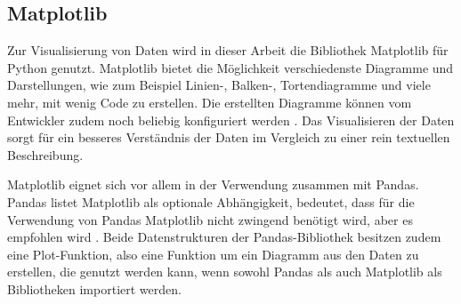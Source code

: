 \subsection{Matplotlib}
Zur Visualisierung von Daten wird in dieser Arbeit die Bibliothek Matplotlib für Python genutzt. Matplotlib bietet die Möglichkeit verschiedenste Diagramme und Darstellungen,
wie zum Beispiel Linien-, Balken-, Tortendiagramme und viele mehr, mit wenig Code zu erstellen. Die erstellten Diagramme können vom Entwickler zudem noch beliebig 
konfiguriert werden \cite[vgl. S.167.]{NumerischesPython}. Das Visualisieren der Daten sorgt für ein besseres Verständnis der Daten im Vergleich zu einer rein textuellen Beschreibung.

Matplotlib eignet sich vor allem in der Verwendung zusammen mit Pandas. Pandas listet Matplotlib als \glqq optionale Abhängigkeit\grqq{}, bedeutet, dass für die Verwendung
von Pandas Matplotlib nicht zwingend benötigt wird, aber es empfohlen wird \cite[vgl. S.253]{NumerischesPython}.
Beide Datenstrukturen der Pandas-Bibliothek besitzen zudem eine Plot-Funktion, also eine Funktion um ein Diagramm aus den Daten zu erstellen, 
die genutzt werden kann, wenn sowohl Pandas als auch Matplotlib als Bibliotheken importiert werden.